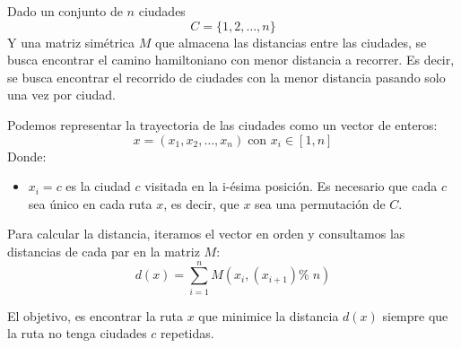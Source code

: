 \documentclass[12pt,twoside]{article}
\begin{document}
	Dado un conjunto de $n$ ciudades \[ C = \{1,2, \dots , n\} \] Y una matriz simétrica $M$ que almacena las distancias entre las ciudades, se busca encontrar el camino hamiltoniano con menor distancia a recorrer. Es decir, se busca encontrar el recorrido de ciudades con la menor distancia pasando solo una vez por ciudad.
	
	Podemos representar la trayectoria de las ciudades como un vector de enteros:
	\[ x = (x_1, x_2, \dots, x_n) \; \text{con } x_i \in [1, n] \]
	Donde:
	\begin{itemize}
		\item $x_i = c$ es la ciudad $c$ visitada en la i-ésima posición. Es necesario que cada $c$ sea único en cada ruta $x$, es decir, que $x$ sea una permutación de $C$.
	\end{itemize}
	
	Para calcular la distancia, iteramos el vector en orden y consultamos las distancias de cada par en la matriz $M$: 
	\[ d(x) = \sum_{i = 1}^{n} M(x_i, (x_{i + 1}) \%\; n) \]
	
	El objetivo, es encontrar la ruta $x$ que minimice la distancia $d(x)$ siempre que la ruta no tenga ciudades $c$ repetidas.
	
\end{document}
